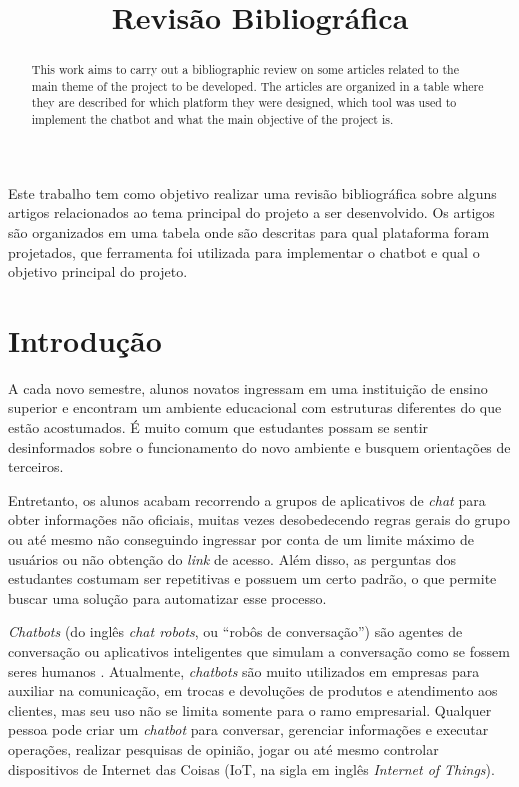 \documentclass[12pt]{article}
\title{Revisão Bibliográfica}
\begin{document}
 

\maketitle

\begin{abstract}
This work aims to carry out a bibliographic review on some articles related to the main theme of the project to be developed. The articles are organized in a table where they are described for which platform they were designed, which tool was used to implement the chatbot and what the main objective of the project is.
\end{abstract}
     
\begin{resumo} 
Este trabalho tem como objetivo realizar uma revisão bibliográfica sobre alguns artigos relacionados ao tema principal do projeto a ser desenvolvido. Os artigos são organizados em uma tabela onde são descritas para qual plataforma foram projetados, que ferramenta foi utilizada para implementar o chatbot e qual o objetivo principal do projeto.
\end{resumo}


\section{Introdução}

A cada novo semestre, alunos novatos ingressam em uma instituição de ensino superior e encontram um ambiente educacional com estruturas diferentes do que estão acostumados. É muito comum que estudantes possam se sentir desinformados sobre o funcionamento do novo ambiente e busquem orientações de terceiros. 

Entretanto, os alunos acabam recorrendo a grupos de aplicativos de {\itshape chat} para obter informações não oficiais, muitas vezes desobedecendo regras gerais do grupo ou até mesmo não conseguindo ingressar por conta de um limite máximo de usuários ou não obtenção do {\itshape link} de acesso. Além disso, as perguntas dos estudantes costumam ser repetitivas e possuem um certo padrão, o que permite buscar uma solução para automatizar esse processo.

{\itshape Chatbots} (do inglês {\itshape chat robots}, ou “robôs de conversação”) são agentes de conversação ou aplicativos inteligentes que simulam a conversação como se fossem seres humanos \cite{lucchesi:18}. Atualmente, {\itshape chatbots} são muito utilizados em empresas para auxiliar na comunicação, em trocas e devoluções de produtos e atendimento aos clientes, mas seu uso não se limita somente para o ramo empresarial. Qualquer pessoa pode criar um {\itshape chatbot} para conversar, gerenciar informações e executar operações, realizar pesquisas de opinião, jogar ou até mesmo controlar dispositivos de Internet das Coisas (IoT, na sigla em inglês {\itshape Internet of Things}).
\end{document}
